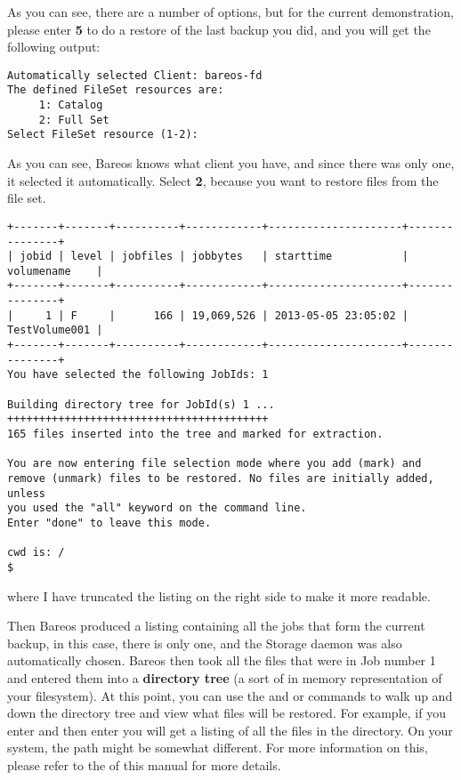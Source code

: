 As you can see, there are a number of options, but for the current
demonstration, please enter {\bf 5} to do a restore of the last backup you
did, and you will get the following output:

\footnotesize
\begin{verbatim}
Automatically selected Client: bareos-fd
The defined FileSet resources are:
     1: Catalog
     2: Full Set
Select FileSet resource (1-2): 
\end{verbatim}
\normalsize

As you can see, Bareos knows what client
you have, and since there was only one, it selected it automatically.
Select {\bf 2}, because you want to restore files from the file set.

\footnotesize
\begin{verbatim}
+-------+-------+----------+------------+---------------------+---------------+
| jobid | level | jobfiles | jobbytes   | starttime           | volumename    |
+-------+-------+----------+------------+---------------------+---------------+
|     1 | F     |      166 | 19,069,526 | 2013-05-05 23:05:02 | TestVolume001 |
+-------+-------+----------+------------+---------------------+---------------+
You have selected the following JobIds: 1

Building directory tree for JobId(s) 1 ...  +++++++++++++++++++++++++++++++++++++++++
165 files inserted into the tree and marked for extraction.

You are now entering file selection mode where you add (mark) and
remove (unmark) files to be restored. No files are initially added, unless
you used the "all" keyword on the command line.
Enter "done" to leave this mode.

cwd is: /
$ 
\end{verbatim}
\normalsize

where I have truncated the listing on the right side to make it more readable.

Then Bareos produced a listing containing all the jobs that
form the current backup, in this case, there is only one, and the Storage
daemon was also automatically chosen. Bareos then took all the files that were
in Job number 1 and entered them into a {\bf directory tree} (a sort of in
memory representation of your filesystem). At this point, you can use the 
 and  or  commands to walk up and down the directory tree
and view what files will be restored. For example, if you enter 
and then enter  you will get a listing
of all the files in the  directory.
On your system, the path might be somewhat different.
For more information on this, please refer to the
 of this manual for
more details.

